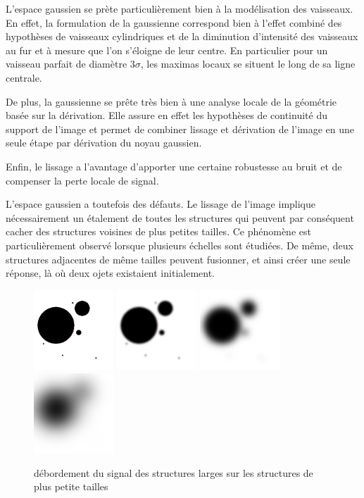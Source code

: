 L'espace gaussien se prète particulièrement bien à la modélisation des vaisseaux. En effet, la formulation de la gaussienne correspond bien à l'effet combiné des hypothèses de vaisseaux cylindriques et de la diminution d'intensité des vaisseaux au fur et à mesure que l'on s'éloigne de leur centre. En particulier pour un vaisseau parfait de diamètre $3\sigma$, les maximas locaux se situent le long de sa ligne centrale.

De plus, la gaussienne se prête très bien à une analyse locale de la géométrie basée sur la dérivation. Elle assure en effet les hypothèses de continuité du support de l'image et permet de combiner lissage et dérivation de l'image en une seule étape par dérivation du noyau gaussien.

Enfin, le lissage a l'avantage d'apporter une certaine robustesse au bruit et de compenser la perte locale de signal.

L'espace gaussien a toutefois des défauts. Le lissage de l'image implique nécessairement un étalement de toutes les structures qui peuvent par conséquent cacher des structures voisines de plus petites tailles. Ce phénomène est particulièrement observé lorsque plusieurs échelles sont étudiées. De même, deux structures adjacentes de même tailles peuvent fusionner, et ainsi créer une seule réponse, là où deux ojets existaient initialement.

\begin{figure}
  \centering
  \includegraphics[height=3cm]{Images/gaussian_spilling_init.png}
  \includegraphics[height=3cm]{Images/gaussian_spilling_g10.png}
  \includegraphics[height=3cm]{Images/gaussian_spilling_g40.png}
  \includegraphics[height=3cm]{Images/gaussian_spilling_g100.png}
  \label{fig:scale_space_spilling}
  \caption{débordement du signal des structures larges sur les structures de plus petite tailles}
\end{figure}



